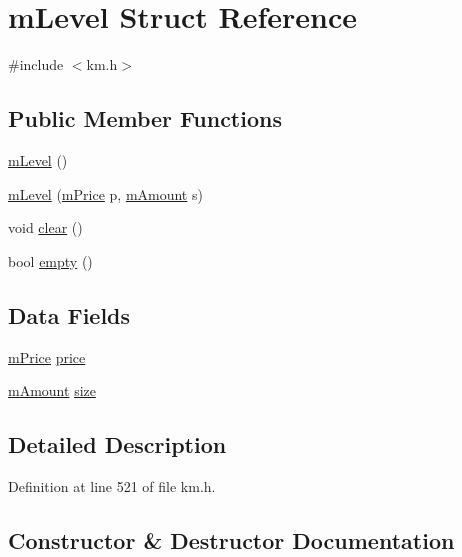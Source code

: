 \hypertarget{struct_k_1_1m_level}{}\section{m\+Level Struct Reference}
\label{struct_k_1_1m_level}


{\ttfamily \#include $<$km.\+h$>$}

\subsection*{Public Member Functions}
\begin{DoxyCompactItemize}
\item 
\hyperlink{struct_k_1_1m_level_ad5216c3c5a1b4caa281288def06efbf0}{m\+Level} ()
\item 
\hyperlink{struct_k_1_1m_level_a359185b2836597cffdfe23c5f5bcc029}{m\+Level} (\hyperlink{km_8h_a392f9b7f384aa3539bbb890b059f5b8c}{m\+Price} p, \hyperlink{km_8h_ad4d00888c55a47a8a40ed8020d176086}{m\+Amount} s)
\item 
void \hyperlink{struct_k_1_1m_level_ac8bb3912a3ce86b15842e79d0b421204}{clear} ()
\item 
bool \hyperlink{struct_k_1_1m_level_a3f37b042a1e7cd4bd38fc564de81f0da}{empty} ()
\end{DoxyCompactItemize}
\subsection*{Data Fields}
\begin{DoxyCompactItemize}
\item 
\hyperlink{km_8h_a392f9b7f384aa3539bbb890b059f5b8c}{m\+Price} \hyperlink{struct_k_1_1m_level_a96d6f95b2441f538965c5d8c1aa32f4e}{price}
\item 
\hyperlink{km_8h_ad4d00888c55a47a8a40ed8020d176086}{m\+Amount} \hyperlink{struct_k_1_1m_level_a80e6b92688e6f32c50432b26bf8b197c}{size}
\end{DoxyCompactItemize}


\subsection{Detailed Description}


Definition at line 521 of file km.\+h.



\subsection{Constructor \& Destructor Documentation}
